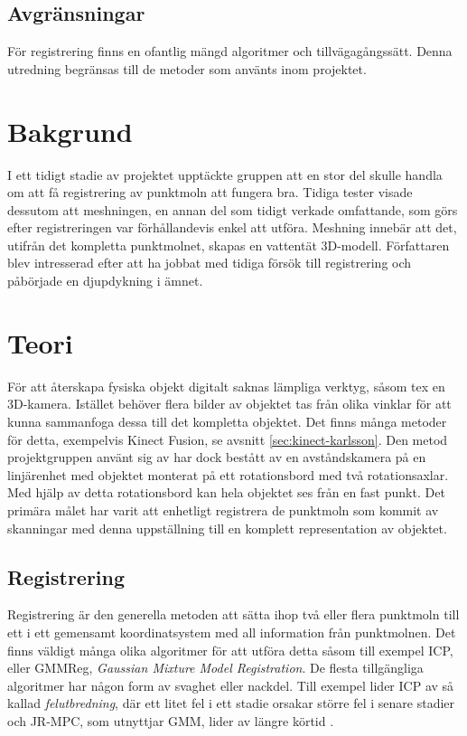 \subsection{Avgränsningar}
\label{sec:limits-karlsson}
För registrering finns en ofantlig mängd algoritmer och tillvägagångssätt. Denna utredning begränsas till de metoder som använts inom projektet. 


\section{Bakgrund}
\label{sec:background-karlsson}
I ett tidigt stadie av projektet upptäckte gruppen att en stor del skulle handla om att få registrering av punktmoln att fungera bra. Tidiga tester visade dessutom att meshningen, en annan del som tidigt verkade omfattande, som görs efter registreringen var förhållandevis enkel att utföra. Meshning innebär att det, utifrån det kompletta punktmolnet, skapas en vattentät 3D-modell. Författaren blev intresserad efter att ha jobbat  med tidiga försök till registrering och påbörjade en djupdykning i ämnet.


\section{Teori}
\label{sec:theory-karlsson}

För att återskapa fysiska objekt digitalt saknas lämpliga verktyg, såsom tex en 3D-kamera. Istället behöver flera bilder av objektet tas från olika vinklar för att kunna sammanfoga dessa till det kompletta objektet. Det finns många metoder för detta, exempelvis Kinect Fusion, se avsnitt \ref{sec:kinect-karlsson}. Den metod projektgruppen använt sig av har dock bestått av en avståndskamera på en linjärenhet med objektet monterat på ett rotationsbord med två rotationsaxlar. Med hjälp av detta rotationsbord kan hela objektet ses från en fast punkt. Det primära målet har varit att enhetligt registrera de punktmoln som kommit av skanningar med denna uppställning till en komplett representation av objektet.


\subsection{Registrering}
\label{sec:registrering-karlsson}

Registrering är den generella metoden att sätta ihop två eller flera punktmoln till ett i ett gemensamt koordinatsystem med all information från punktmolnen. Det finns väldigt många olika algoritmer för att utföra detta såsom till exempel ICP, eller GMMReg, \textit{Gaussian Mixture Model Registration}. De flesta tillgängliga algoritmer har någon form av svaghet eller nackdel. Till exempel lider ICP av så kallad \textit{felutbredning}, där ett litet fel i ett stadie orsakar större fel i senare stadier och JR-MPC, som utnyttjar GMM, lider av längre körtid \cite{Evangelidis-ECCV-2014}.


